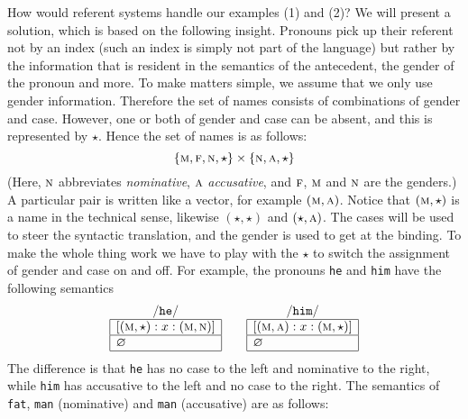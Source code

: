 How would referent systems handle our examples (1) and (2)?
We will present a solution, which is based on the following
insight. Pronouns pick up their referent not by an index
(such an index is simply not part of the language) but rather
by the information that is resident in the semantics of the
antecedent, the gender of the pronoun and more. To make
matters simple, we assume that we only use gender information.
Therefore the set of names consists of combinations of gender
and case. However, one or both of gender and case can be
absent, and this is represented by $\star$.
Hence the set of names is as follows:
\newcommand{\ms}{\mbox{\sc m}}
\newcommand{\nm}{\mbox{\sc n}}
\newcommand{\ac}{\mbox{\sc a}}
\newcommand{\fm}{\mbox{\sc f}}
\newcommand{\nt}{\mbox{\sc n}}
\newcommand{\spr}[2]{(#1, #2)}
$$\{\ms, \fm, \nt, \star\} \times \{\nm, \ac, \star\}$$
(Here, $\nm$ abbreviates {\it nominative}, $\ac$ {\it
accusative}, and $\fm$, $\ms$ and $\nt$ are the genders.)
A particular pair is written like a vector, for example
$\spr{\ms}{\ac}$. Notice that $\spr{\ms}{\star}$ is a
name in the technical sense, likewise $\spr{\star}{\star}$
and $\spr{\star}{\ac}$. The cases will be used to steer the
syntactic translation, and the gender is used to get at
the binding. To make the whole thing work we have to play
with the $\star$ to switch the assignment of gender and
case on and off. For example, the pronouns {\tt he}
and {\tt him} have the following semantics
$$\begin{array}{|l|}
\multicolumn{1}{c}{/\mbox{\tt he}/} \\
\hline
\left[ \spr{\ms}{\star} : x : \spr{\ms}{\nm}\right]
\\\hline
\varnothing \\\hline
\end{array} \qquad
\begin{array}{|l|}
\multicolumn{1}{c}{/\mbox{\tt him}/} \\
\hline
\left[ \spr{\ms}{\ac} : x : \spr{\ms}{\star}\right]
\\\hline
\varnothing \\\hline
\end{array}$$
The difference is that {\tt he} has no case to the left and
nominative to the right, while {\tt him} has accusative to
the left and no case to the right. The semantics of {\tt fat},
{\tt man} (nominative) and {\tt man} (accusative) are as follows:
